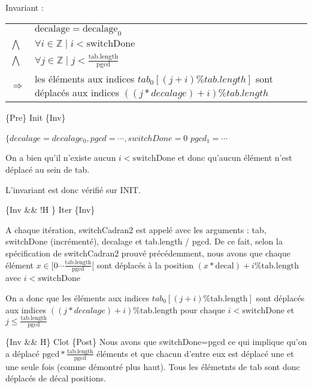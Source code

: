 Invariant :

\begin{tabular}{ll}

& $\mathrm{decalage}=\mathrm{decalage}_{0}$ \\
$\bigwedge$ & $\forall i \in \mathbb{Z} \mid i < \mathrm{switchDone} $ \\
$\bigwedge$ & $\forall j \in \mathbb{Z} \mid j < \frac{\mathrm{tab.length}}{\mathrm{pgcd}}$ \\
$\Rightarrow$ & les éléments aux indices $tab_{0}[(j+i) \% tab.length]$ sont déplacés aux indices $((j*decalage)+i) \% tab.length$
\end{tabular}

\{Pre\} Init \{Inv\}

$\{decalage=decalage_{0}, pgcd =\cdots, switchDone=0$
$pgcd_{1} = \cdots$

On a bien qu'il n'existe aucun $i < \mathrm{switchDone}$ et donc
qu'aucun élément n'est déplacé au sein de tab.

L'invariant est donc vérifié sur INIT.

\{Inv \&\& !H \} Iter \{Inv\}

A chaque itération, switchCadran2 est appelé avec les arguments : tab,
switchDone (incrémenté), decalage et tab.length / pgcd. De ce fait,
selon la spécification de switchCadran2 prouvé précédemment, nous avons
que chaque élément $x \in [0\cdots
    \frac{\mathrm{tab.length}}{\mathrm{pgcd}}[$ sont déplacés à la
        position $(x*\mathrm{decal})+i \% \mathrm{tab.length}$ avec $i < \mathrm{switchDone}$

On a donc que les éléments aux indices
$tab_{0}[(j+i)\%\mathrm{tab.length}]$ sont déplacés aux indices
$((j*decalage) + i) \% \mathrm{tab.length}$ pour chaque $i <
\mathrm{switchDone}$
et $j \leq \frac{\mathrm{tab.length}}{\mathrm{pgcd}}$

\{Inv \&\& H\} Clot \{Post\} Nous avons que switchDone=pgcd ce qui implique qu'on a déplacé
$\mathrm{pgcd}*\frac{\mathrm{tab.length}}{\mathrm{pgcd}}$ éléments et
que chacun d'entre eux est déplacé une et une seule fois (comme démontré
plus haut). Tous les élémetnts de tab sont donc déplacés de décal positions.
